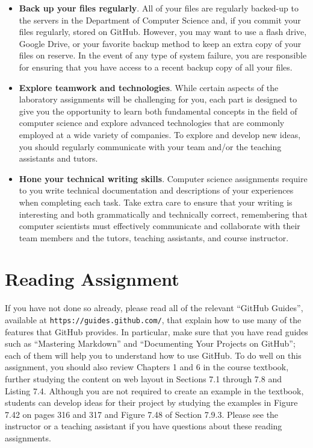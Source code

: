 \documentclass[11pt]{article}
\newcommand{\url}[1]{\lstinline{#1}}
\begin{document}
\begin{itemize}
\item {\bf Back up your files regularly}. All of your files are regularly backed-up to the servers in the Department of
  Computer Science and, if you commit your files regularly, stored on GitHub. However, you may want to use a flash
  drive, Google Drive, or your favorite backup method to keep an extra copy of your files on reserve. In the event of
  any type of system failure, you are responsible for ensuring that you have access to a recent backup copy of all your
  files.

\item {\bf Explore teamwork and technologies}. While certain aspects of the laboratory assignments will be challenging
  for you, each part is designed to give you the opportunity to learn both fundamental concepts in the field of computer
  science and explore advanced technologies that are commonly employed at a wide variety of companies. To explore and
  develop new ideas, you should regularly communicate with your team and/or the teaching assistants and tutors.

\item {\bf Hone your technical writing skills}. Computer science assignments require to you write technical
  documentation and descriptions of your experiences when completing each task. Take extra care to ensure that your
  writing is interesting and both grammatically and technically correct, remembering that computer scientists must
  effectively communicate and collaborate with their team members and the tutors, teaching assistants, and course
  instructor.


\end{itemize}

\section*{Reading Assignment}

If you have not done so already, please read all of the relevant ``GitHub
Guides'', available at \url{https://guides.github.com/}, that explain how to use
many of the features that GitHub provides. In particular, make sure that you
have read guides such as ``Mastering Markdown'' and ``Documenting Your Projects
on GitHub''; each of them will help you to understand how to use GitHub. To do
well on this assignment, you should also review Chapters 1 and 6 in the course
textbook, further studying the content on web layout in Sections 7.1 through 7.8
and Listing 7.4. Although you are not required to create an example in the
textbook, students can develop ideas for their project by studying the examples
in Figure 7.42 on pages 316 and 317 and Figure 7.48 of Section 7.9.3. Please see
the instructor or a teaching assistant if you have questions about these reading
assignments.
\end{document}
